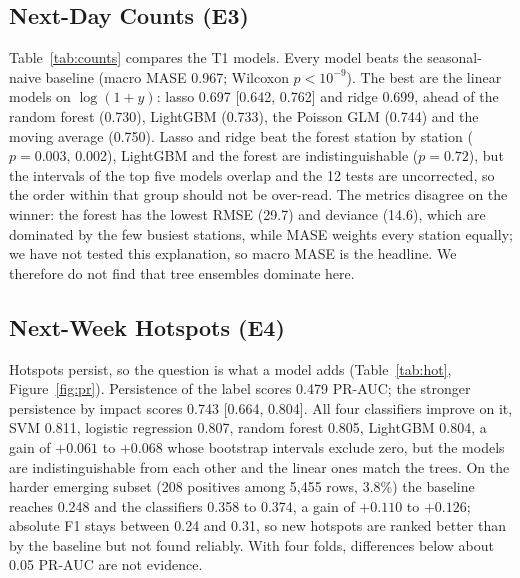 \documentclass[conference]{IEEEtran}
\newcommand{\tab}[1]{}
\begin{document}
\subsection{Next-Day Counts (E3)}
Table~\ref{tab:counts} compares the T1 models. Every model beats the seasonal-naive baseline (macro MASE 0.967; Wilcoxon \(p<10^{-9}\)). The best are the linear models on \(\log(1{+}y)\): lasso 0.697 [0.642, 0.762] and ridge 0.699, ahead of the random forest (0.730), LightGBM (0.733), the Poisson GLM (0.744) and the moving average (0.750). Lasso and ridge beat the forest station by station (\(p=0.003\), 0.002), LightGBM and the forest are indistinguishable (\(p=0.72\)), but the intervals of the top five models overlap and the 12 tests are uncorrected, so the order within that group should not be over-read. The metrics disagree on the winner: the forest has the lowest RMSE (29.7) and deviance (14.6), which are dominated by the few busiest stations, while MASE weights every station equally; we have not tested this explanation, so macro MASE is the headline. We therefore do not find that tree ensembles dominate here.

\begin{table}[t]
\centering
\caption{T1, next-day counts, four time-blocked folds. Macro MASE (lower is better, 1.0 = seasonal naive) with a 95\% bootstrap interval over stations; RMSE and mean Poisson deviance (Dev.).}
\label{tab:counts}
\footnotesize\setlength{\tabcolsep}{2.5pt}
\tab{counts}
\end{table}

\subsection{Next-Week Hotspots (E4)}
Hotspots persist, so the question is what a model adds (Table~\ref{tab:hot}, Figure~\ref{fig:pr}). Persistence of the label scores 0.479 PR-AUC; the stronger persistence by impact scores 0.743 [0.664, 0.804]. All four classifiers improve on it, SVM 0.811, logistic regression 0.807, random forest 0.805, LightGBM 0.804, a gain of \(+0.061\) to \(+0.068\) whose bootstrap intervals exclude zero, but the models are indistinguishable from each other and the linear ones match the trees. On the harder emerging subset (208 positives among 5{,}455 rows, 3.8\%) the baseline reaches 0.248 and the classifiers 0.358 to 0.374, a gain of \(+0.110\) to \(+0.126\); absolute F1 stays between 0.24 and 0.31, so new hotspots are ranked better than by the baseline but not found reliably. With four folds, differences below about 0.05 PR-AUC are not evidence.
\end{document}
